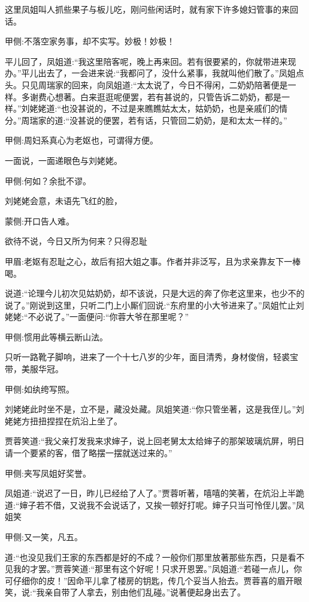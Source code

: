 \begin{parag}
    这里凤姐叫人抓些果子与板儿吃，刚问些闲话时，就有家下许多媳妇管事的来回话。\begin{note}甲侧:不落空家务事，却不实写。妙极！妙极！\end{note}平儿回了，凤姐道:“我这里陪客呢，晚上再来回。若有很要紧的，你就带进来现办。”平儿出去了，一会进来说:“我都问了，没什么紧事，我就叫他们散了。”凤姐点头。只见周瑞家的回来，向凤姐道:“太太说了，今日不得闲，二奶奶陪著便是一样。多谢费心想著。白来逛逛呢便罢，若有甚说的，只管告诉二奶奶，都是一样。”刘姥姥道:“也没甚说的，不过是来瞧瞧姑太太，姑奶奶，也是亲戚们的情分。”周瑞家的道:“没甚说的便罢，若有话，只管回二奶奶，是和太太一样的。”\begin{note}甲侧:周妇系真心为老妪也，可谓得方便。\end{note}一面说，一面递眼色与刘姥姥。\begin{note}甲侧:何如？余批不谬。\end{note}刘姥姥会意，未语先飞红的脸，\begin{note}蒙侧:开口告人难。\end{note}欲待不说，今日又所为何来？只得忍耻\begin{note}甲眉:老妪有忍耻之心，故后有招大姐之事。作者并非泛写，且为求亲靠友下一棒喝。\end{note}说道:“论理今儿初次见姑奶奶，却不该说，只是大远的奔了你老这里来，也少不的说了。”刚说到这里，只听二门上小厮们回说:“东府里的小大爷进来了。”凤姐忙止刘姥姥:“不必说了。”一面便问:“你蓉大爷在那里呢？”\begin{note}甲侧:惯用此等横云断山法。\end{note}只听一路靴子脚响，进来了一个十七八岁的少年，面目清秀，身材俊俏，轻裘宝带，美服华冠。\begin{note}甲侧:如纨绔写照。\end{note}刘姥姥此时坐不是，立不是，藏没处藏。凤姐笑道:“你只管坐著，这是我侄儿。”刘姥姥方扭扭捏捏在炕沿上坐了。
\end{parag}


\begin{parag}
    贾蓉笑道:“我父亲打发我来求婶子，说上回老舅太太给婶子的那架玻璃炕屏，明日请一个要紧的客，借了略摆一摆就送过来的。”\begin{note}甲侧:夹写凤姐好奖誉。\end{note}凤姐道:“说迟了一日，昨儿已经给了人了。”贾蓉听著，嘻嘻的笑著，在炕沿上半跪道:“婶子若不借，又说我不会说话了，又挨一顿好打呢。婶子只当可怜侄儿罢。”凤姐笑\begin{note}甲侧:又一笑，凡五。\end{note}道:“也没见我们王家的东西都是好的不成？一般你们那里放著那些东西，只是看不见我的才罢。”贾蓉笑道:“那里有这个好呢！只求开恩罢。”凤姐道:“若碰一点儿，你可仔细你的皮！”因命平儿拿了楼房的钥匙，传几个妥当人抬去。贾蓉喜的眉开眼笑，说:“我亲自带了人拿去，别由他们乱碰。”说著便起身出去了。
\end{parag}



